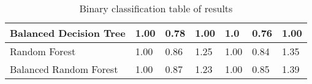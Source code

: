 \begin{table}[htbp]
{\begin{tabular}{l|lll|lll|}
  \multicolumn{1}{|l|}{Balanced Decision Tree}       & \multicolumn{1}{l|}{1.00}                & \multicolumn{1}{l|}{0.78}  & 1.00                                  & \multicolumn{1}{l|}{1.0}                & \multicolumn{1}{l|}{0.76} & 1.00                                  \\ \hline
  \multicolumn{1}{|l|}{Random Forest}                & \multicolumn{1}{l|}{1.00}                & \multicolumn{1}{l|}{0.86} & 1.25                   & \multicolumn{1}{l|}{1.00}                & \multicolumn{1}{l|}{0.84} & 1.35                   \\ \hline
  \multicolumn{1}{|l|}{Balanced Random Forest}       & \multicolumn{1}{l|}{1.00} & \multicolumn{1}{l|}{0.87} & 1.23                   & \multicolumn{1}{l|}{1.00}                & \multicolumn{1}{l|}{0.85} & 1.39                    \\ \hline
  \end{tabular}
}
\caption{Binary classification table of results}
\label{tab:binary}
\end{table}



